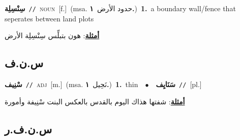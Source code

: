 \documentclass[10pt,a4paper,twoside]{article} %
\begin{document}
\begin{multicols}{2}
{\setlength\topsep{0pt}\textbf{\foreignlanguage{arabic}{سِنْسِلِة}}\ {\color{gray}\texttt{//}\color{black}}\ \textsc{noun}\ [f.]\ \color{gray}(msa. \foreignlanguage{arabic}{حدود الأرض}~\foreignlanguage{arabic}{\textbf{١.}})\color{black}\ \textbf{1.}~a boundary wall/fence that seperates between land plots\  \begin{flushright}\color{gray}\foreignlanguage{arabic}{\textbf{\underline{\foreignlanguage{arabic}{أمثلة}}}: هون بتبلِّس سِنْسِلِة الأرض}\end{flushright}\color{black}} \vspace{2mm}

\vspace{-3mm}
\subsection*{\color{blue}\foreignlanguage{arabic}{س.ن.ف}\color{blue}{}} 

{\setlength\topsep{0pt}\textbf{\foreignlanguage{arabic}{سْنِيف}}\ {\color{gray}\texttt{//}\color{black}}\ \textsc{adj}\ [m.]\ \color{gray}(msa. \foreignlanguage{arabic}{نَحِيل}~\foreignlanguage{arabic}{\textbf{١.}})\color{black}\ \textbf{1.}~thin\ \ $\bullet$\ \ \setlength\topsep{0pt}\textbf{\foreignlanguage{arabic}{سَنَايِف}}\ {\color{gray}\texttt{//}\color{black}}\ [pl.]\  \begin{flushright}\color{gray}\foreignlanguage{arabic}{\textbf{\underline{\foreignlanguage{arabic}{أمثلة}}}: شفتها هذاك اليوم بالقدس بالعكس البنت سْنِيفة وأمورة}\end{flushright}\color{black}} \vspace{2mm}

\vspace{-3mm}
\subsection*{\color{blue}\foreignlanguage{arabic}{س.ن.ف.ر}\color{blue}{}} 


\end{multicols}
\end{document}
